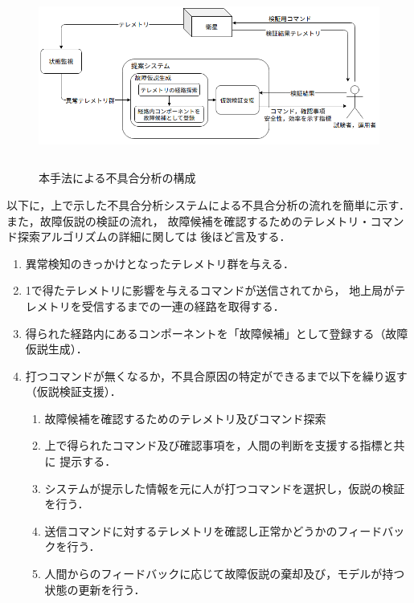 \documentclass[11pt]{jsreport}
\begin{document}
\begin{figure}[H]
   \centering
     \includegraphics[height=6.0cm]{figure/whole_flow.png}
     \caption{本手法による不具合分析の構成}
     \label{fig:whole_flow}
 \end{figure}

以下に，上で示した不具合分析システムによる不具合分析の流れを簡単に示す．
また，故障仮説の検証の流れ，
故障候補を確認するためのテレメトリ・コマンド探索アルゴリズムの詳細に関しては
後ほど言及する．

\begin{enumerate}[1]
   \item 異常検知のきっかけとなったテレメトリ群を与える．
   \item 1で得たテレメトリに影響を与えるコマンドが送信されてから，
   地上局がテレメトリを受信するまでの一連の経路を取得する．
   \item 得られた経路内にあるコンポーネントを「故障候補」として登録する（故障仮説生成）．
   \item 打つコマンドが無くなるか，不具合原因の特定ができるまで以下を繰り返す（仮説検証支援）．
   \begin{enumerate}[a]
      \item 故障候補を確認するためのテレメトリ及びコマンド探索
      \item 上で得られたコマンド及び確認事項を，人間の判断を支援する指標と共に
      提示する．
      \item システムが提示した情報を元に人が打つコマンドを選択し，仮説の検証を行う．
      \item 送信コマンドに対するテレメトリを確認し正常かどうかのフィードバックを行う．
      \item 人間からのフィードバックに応じて故障仮説の棄却及び，モデルが持つ状態の更新を行う．
   \end{enumerate}
\end{enumerate}
\end{document}
